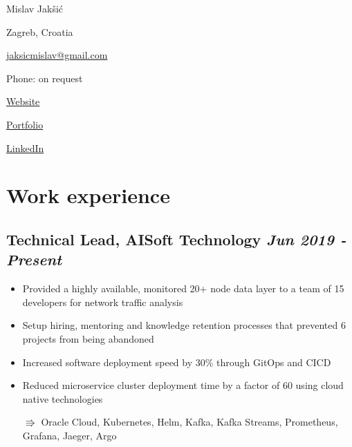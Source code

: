 \documentclass[a4paper]{article}
\newcommand{\bolditalicpair}
[2]
{\textbf{#1} \texorpdfstring{\hfill}{} \textit{#2}}
\begin{document}
\begin{multicols}{3}

\noindent
\begin{minipage}{.22\textwidth}
\raggedright

{\huge Mislav Jakšić}

Zagreb, Croatia
\end{minipage}

\noindent
\begin{minipage}{.50\textwidth}
\raggedleft

\href{mailto:jaksicmislav@gmail.com}{jaksicmislav@gmail.com}

Phone: on request

\end{minipage}

\noindent
\begin{minipage}{.32\textwidth}
\raggedleft

\href{https://mislav-jaksic.from.hr/}{Website}

\href{https://github.com/MislavJaksic}{Portfolio}

\href{https://www.linkedin.com/in/mislav-jaksic}{LinkedIn}

\end{minipage}

\end{multicols}



\section{Work experience}
\subsection{\bolditalicpair{Technical Lead, AISoft Technology}{Jun 2019 - Present}}

\begin{itemize}
 \item Provided a highly available, monitored 20+ node data layer to a team of 15 developers for network traffic analysis
 \item Setup hiring, mentoring and knowledge retention processes that prevented 6 projects from being abandoned
 \item Increased software deployment speed by 30\% through GitOps and CICD
 \item Reduced microservice cluster deployment time by a factor of 60 using cloud native technologies
 \item[$\Rrightarrow$] Oracle Cloud, Kubernetes, Helm, Kafka, Kafka Streams, Prometheus, Grafana, Jaeger, Argo
\end{itemize}
\end{document}

